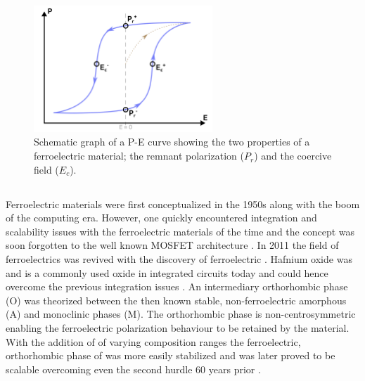 \documentclass[11pt,twoside]{eitExjobb}
\begin{document}
\begin{figure}[htbp]
    \centering
    \includegraphics[width=0.60\textwidth]{fig/img/PE.png}
    \caption{Schematic graph of a P-E curve showing the two properties of a
        ferroelectric material; the remnant polarization ($P_r$) and the
        coercive field ($E_c$).}
    \label{fig:theo_PE}
\end{figure}

\subsection{}

Ferroelectric materials were first conceptualized in the 1950s along with the
boom of the computing era. However, one quickly encountered integration and
scalability issues with the ferroelectric materials of the time and the concept
was soon forgotten to the well known MOSFET architecture
\cite{mikolajick2020past}. In 2011 the field of ferroelectrics was revived with
the discovery of ferroelectric . Hafnium oxide was and is a commonly
used oxide in integrated circuits today and could hence overcome the previous
integration issues \cite{boscke2011ferroelectricity}. An intermediary
orthorhombic phase (O) was theorized between the then known stable,
non-ferroelectric amorphous (A) and monoclinic phases (M). The orthorhombic
phase is non-centrosymmetric enabling the ferroelectric polarization behaviour
to be retained by the material. With the addition of  of varying
composition ranges the ferroelectric, orthorhombic phase of  was more
easily stabilized and was later proved to be scalable overcoming even the
second hurdle 60 years prior \cite{muller2012ferroelectricity, cheema2020one}.
\end{document}
